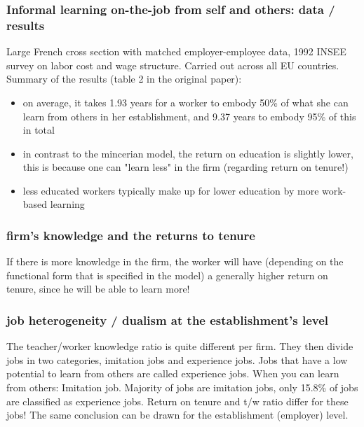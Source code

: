 \documentclass[12pt,a4paper]{article}
\begin{document}
  \subsubsection{Informal learning on-the-job from self and others: data / results} %
  \label{ssub:Informal learning on-the-job from self and others: results}
  Large French cross section with matched employer-employee data, 1992 INSEE survey on labor cost
  and wage structure. Carried out across all EU countries. Summary of the results (table 2 in the original paper):
  \begin{itemize}
    \item on average, it takes 1.93 years for a worker to embody 50\% of what she can learn from
      others in her establishment, and 9.37 years to embody 95\% of this in total
    \item in contrast to the mincerian model, the return on education is slightly lower, this is
      because one can "learn less" in the firm (regarding return on tenure!)
    \item less educated workers typically make up for lower education by more work-based learning
  \end{itemize}

  \subsubsection{firm's knowledge and the returns to tenure} %
  \label{ssub:firm's knowledge and the returns to tenure}
  If there is more knowledge in the firm, the worker will have
  (depending on the functional form that is specified in the model) a generally higher return on
  tenure, since he will be able to learn more!


  \subsubsection{job heterogeneity / dualism at the establishment's level} %
  \label{ssub:job heterogeneity}
  The teacher/worker knowledge ratio is quite different per firm. They then divide jobs in two
  categories, imitation jobs and experience jobs. Jobs that have a low potential to learn from
  others are called experience jobs. When you can learn from others: Imitation job. Majority of jobs
  are imitation jobs, only 15.8\% of jobs are classified as experience jobs. Return on tenure and
  t/w ratio differ for these jobs!  The same conclusion can be drawn for the establishment (employer) level.
\end{document}
